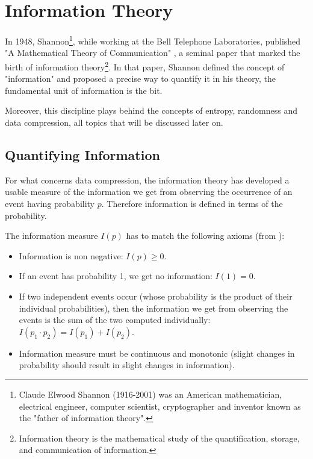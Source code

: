 \documentclass[12pt, a4paper]{report}
\begin{document}
\pagestyle{fancy}
\tableofcontents
\clearpage

\pagestyle{fancy}
\newpage
{}
\chapter{Information Theory}

In 1948, Shannon\footnote{Claude Elwood Shannon (1916-2001) was an American mathematician, electrical engineer, computer
scientist, cryptographer and inventor known as the "father of information theory".}, while working at the Bell Telephone
Laboratories, published "A Mathematical Theory of Communication" \cite{AMathematicalTheoryOfCommunication}, a seminal paper that
marked the birth of information theory\footnote{Information theory is the mathematical study of the quantification, storage, and
communication of information.}.
In that paper, Shannon defined the concept of "information" and proposed a precise way to quantify it in his theory, the
fundamental unit of information is the bit.

Moreover, this discipline plays behind the concepts of entropy, randomness and data compression, all topics that will be discussed
later on.

\section{Quantifying Information}

For what concerns data compression, the information theory has developed a usable measure of the information we get from observing
the occurrence of an event having probability \(p\).
Therefore information is defined in terms of the probability.

The information measure \(I(p)\) has to match the following axioms (from \cite{AnIntroductionToInformationTheoryAndEntropy}):

\begin{itemize}
  \item Information is non negative: \(I(p) \geq 0\).
  \item If an event has probability 1, we get no information: \(I(1) = 0\).
  \item If two independent events occur (whose probability is the product of their individual probabilities), then the information
  we get from observing the events is the sum of the two computed individually: \(I(p_1 \cdot p_2) = I(p_1) + I(p_2)\).
  \item Information measure must be continuous and monotonic (slight changes in probability should result in slight changes in
  information).
\end{itemize}
\end{document}
